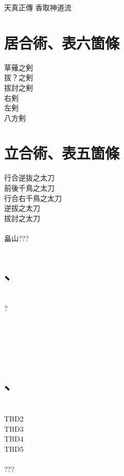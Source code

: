 \documentclass[dvipdfmx, a4paper, 12pt]{utarticle}
\begin{document}
\begin{CJK*}{UTF8}{min}
\CJKtilde
\begin{landscape}

\newpage
\pagestyle{empty}
天真正傳
香取神道流
\section{居合術、表六箇條}
\noindent 草薙之剣\\
拔？之剣\\
拔討之剣\\
右剣\\
左剣\\
八方剣\\
\section{立合術、表五箇條}
\noindent 行合逆抜之太刀\\
前後千鳥之太刀\\
行合右千鳥之太刀\\
逆拔之太刀\\
拔討之太刀\\
\\
畠山???

\setcounter{section}{0}
\newpage
\pagestyle{empty}
\section{、}
\noindent {}\\
?\\
\\
\\
\\
\\
\section{、}
\noindent {}\\
TBD2\\
TBD3\\
TBD4\\
TBD5\\
\\
???


\end{landscape}
\end{CJK*}
\end{document}
